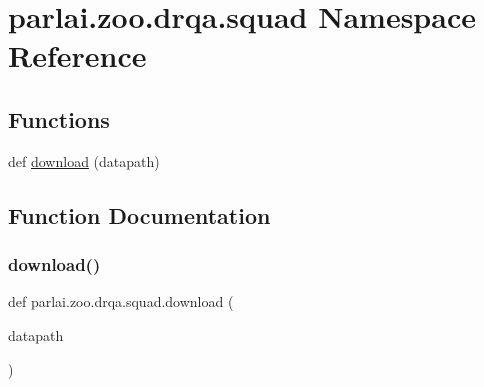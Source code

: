 \hypertarget{namespaceparlai_1_1zoo_1_1drqa_1_1squad}{}\section{parlai.\+zoo.\+drqa.\+squad Namespace Reference}
\label{namespaceparlai_1_1zoo_1_1drqa_1_1squad}
\subsection*{Functions}
\begin{DoxyCompactItemize}
\item 
def \hyperlink{namespaceparlai_1_1zoo_1_1drqa_1_1squad_a214382c0fb2cdf9dc92997e884e6c50f}{download} (datapath)
\end{DoxyCompactItemize}


\subsection{Function Documentation}
\mbox{\label{namespaceparlai_1_1zoo_1_1drqa_1_1squad_a214382c0fb2cdf9dc92997e884e6c50f}} 
\subsubsection{\texorpdfstring{download()}{download()}}
{\footnotesize\ttfamily def parlai.\+zoo.\+drqa.\+squad.\+download (\begin{DoxyParamCaption}\item[{}]{datapath }\end{DoxyParamCaption})}

